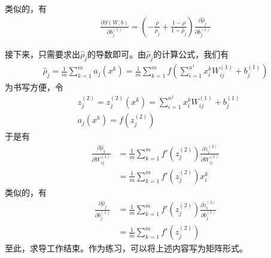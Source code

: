         类似的，有
        \begin{align*}
        \frac{\partial S(W,b)}{\partial b_j^{(1)}} =  \left( -\frac{\rho}{\hat{\rho}_j }+ \frac{1-\rho}{1-\hat{\rho}_j} \right) \frac{\partial \hat{\rho}_j}{\partial b_j^{(1)}}
        \end{align*}
        \par
        接下来，只需要求出$\hat\rho_j$的导数即可。由$\hat\rho_j$的计算公式，我们有
        \begin{align*}
        \hat{\rho}_j = \frac{1}{m} \sum_{k=1}^m a_j(x^k) = \frac{1}{m}\sum_{k=1}^m f \left( \sum_{i=1}^{n^1}x^k_i W_{ij}^{(1)}  + b_j^{(1)}\right)
        \end{align*}
        为书写方便，令
        \begin{align*}
        & z_j^{(2)} =z_j^{(2)}(x^k)= \sum_{i=1}^{n^1}x^k_i W_{ij}^{(1)}  + b_j^{(1)}\\
        & a_j(x^k)= f \left( z_j^{(2)} \right)
        \end{align*}
        于是有
        \begin{align*}
        \frac{\partial \hat{\rho}_j}{\partial W_{ij}^{(1)}} & = \frac{1}{m} \sum_{k=1}^m f'\left( z_j^{(2)} \right) \frac{\partial z_i^{(2)}}{\partial W_{ij}^{(1)}}\\
        & = \frac{1}{m} \sum_{k=1}^m f'\left( z_j^{(2)} \right) x_i^k
        \end{align*}
        类似的，有
        \begin{align*}
        \frac{\partial \hat{\rho}_j}{\partial b_j^{(1)}} & = \frac{1}{m} \sum_{k=1}^m f'\left( z_j^{(2)} \right) \frac{\partial z_i^{(2)}}{\partial b_j^{(1)}}\\
        & = \frac{1}{m} \sum_{k=1}^m f'\left( z_j^{(2)} \right)
        \end{align*}
        至此，求导工作结束。作为练习，可以将上述内容写为矩阵形式。
